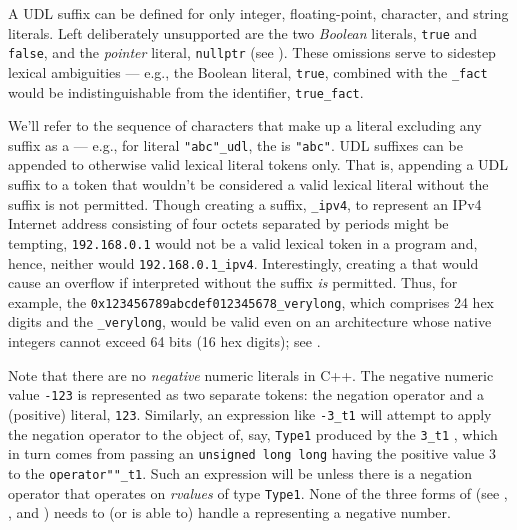 A UDL suffix can be defined for only integer, floating-point, character,
and string literals. Left deliberately unsupported are the two
\emph{Boolean} literals, \lstinline!true! and \lstinline!false!, and the
\emph{pointer} literal, \lstinline!nullptr! (see ). These omissions serve to sidestep
lexical ambiguities --- e.g., the Boolean literal, \lstinline!true!,
combined with the  \lstinline!_fact! would be
indistinguishable from the identifier, \lstinline!true_fact!.

We'll refer to the sequence of characters that make up a literal
excluding any suffix as a  --- e.g., for literal
\lstinline!"abc"_udl!, the  is \lstinline!"abc"!. UDL
suffixes can be appended to otherwise valid lexical literal tokens only.
That is, appending a UDL suffix to a token that
wouldn't be considered a valid lexical literal without the suffix is not permitted.
Though creating a suffix, \lstinline!_ipv4!, to
represent an IPv4 Internet address consisting of four octets separated
by periods might be tempting, \lstinline!192.168.0.1! would not be a valid lexical token in a
program and, hence, neither would \lstinline!192.168.0.1_ipv4!.
Interestingly, creating a  that
would cause an overflow if interpreted without the suffix \emph{is} permitted. Thus, for
example, the  \lstinline!0x123456789abcdef012345678_verylong!,
which comprises 24 hex digits and the 
\lstinline!_verylong!, would be valid even on an architecture whose native
integers cannot exceed 64 bits (16 hex digits); see .

Note that there are no \emph{negative} numeric literals in C++. The
negative numeric value \lstinline!-123! is represented as two separate
tokens: the negation operator and a (positive) literal, \lstinline!123!.
Similarly, an expression like \lstinline!-3_t1! will attempt to apply the
negation operator to the object of, say, \lstinline!Type1! produced by the
\lstinline!3_t1! , which in turn comes from passing an
\lstinline!unsigned!~\lstinline!long!~\lstinline!long! having the positive value
3 to the  \lstinline!operator""_t1!. Such an
expression will be  unless there is a negation
operator that operates on \emph{rvalues} of type \lstinline!Type1!. None of
the three forms of  (see , , and ) needs to (or
is able to) handle a  representing a negative
number.

